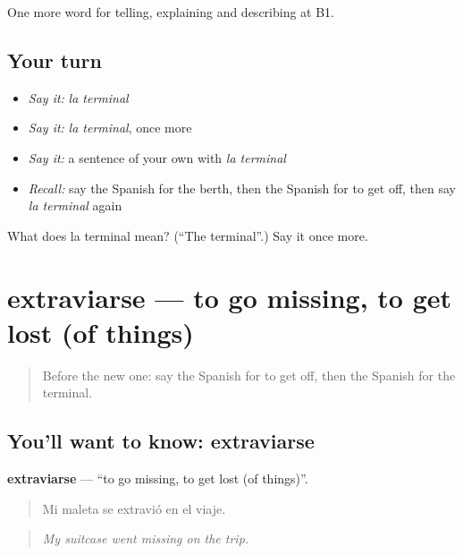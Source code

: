 \begin{grammarlens}[title={What you've built}]
One more word for telling, explaining and describing at B1.
\end{grammarlens}

\subsection*{Your turn}
\begin{itemize}
\raggedright
  \item \emph{Say it:} \emph{la terminal}
  \item \emph{Say it:} \emph{la terminal}, once more
  \item \emph{Say it:} a sentence of your own with \emph{la terminal}
  \item \emph{Recall:} say the Spanish for the berth, then the Spanish for to get off, then say \emph{la terminal} again
\end{itemize}

\begin{tcolorbox}[breakable,colback=teal!4,colframe=teal!35!black,title={Before you move on}]
What does la terminal mean? (\textquotedblleft{}The terminal\textquotedblright{}.) Say it once more.
\end{tcolorbox}
\section[extraviarse]{extraviarse — to go missing, to get lost (of things)}

\label{lesson:ES-C652-extraviarse}



\begin{quote}
Before the new one: say the Spanish for to get off, then the Spanish for the terminal.
\end{quote}

\subsection*{You'll want to know: extraviarse}
\textbf{extraviarse} — \textquotedblleft{}to go missing, to get lost (of things)\textquotedblright{}.

\begin{quote}
Mi maleta se extravió en el viaje.
\end{quote}

\begin{quote}
\emph{My suitcase went missing on the trip.}
\end{quote}

